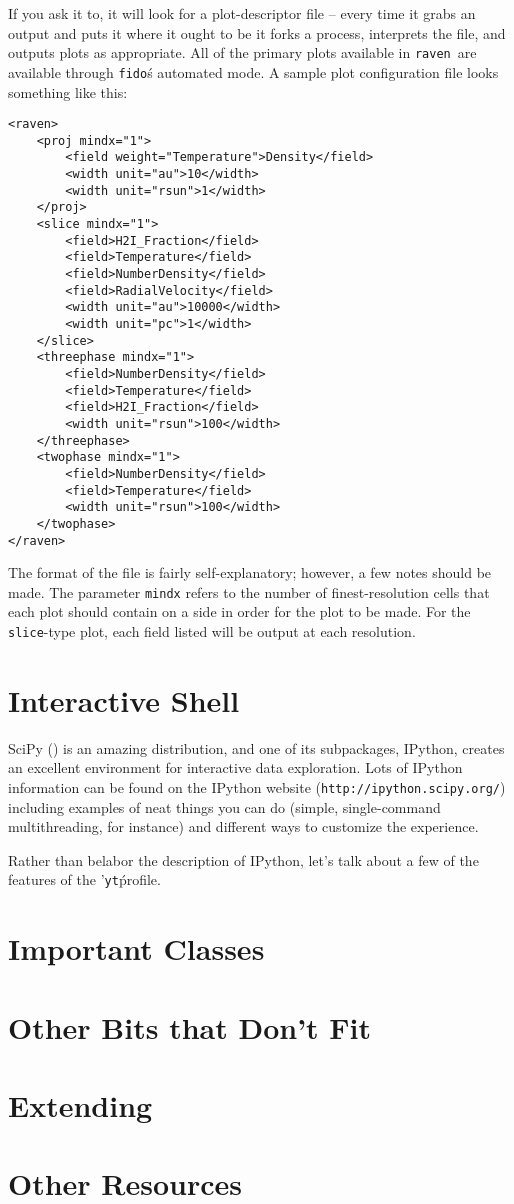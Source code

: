 \documentclass{article}
\newcommand{\fido}{\texttt{fido}}
\newcommand{\raven}{\texttt{raven}}
\newcommand{\yt}{\texttt{yt}}
\begin{document}
If you ask it to, it will look for a plot-descriptor file --  every time it
grabs an output and puts it where it ought to be it forks a process, interprets
the file, and outputs plots as appropriate.  All of the primary plots available
in \raven\ are available through \fido\'s automated mode.  A sample plot
configuration file looks something like this:

\begin{verbatim}
<raven>
    <proj mindx="1">
        <field weight="Temperature">Density</field>
        <width unit="au">10</width>
        <width unit="rsun">1</width>
    </proj>
    <slice mindx="1">
        <field>H2I_Fraction</field>
        <field>Temperature</field>
        <field>NumberDensity</field>
        <field>RadialVelocity</field>
        <width unit="au">10000</width>
        <width unit="pc">1</width>
    </slice>
    <threephase mindx="1">
        <field>NumberDensity</field>
        <field>Temperature</field>
        <field>H2I_Fraction</field>
        <width unit="rsun">100</width>
    </threephase>
    <twophase mindx="1">
        <field>NumberDensity</field>
        <field>Temperature</field>
        <width unit="rsun">100</width>
    </twophase>
</raven>
\end{verbatim}

The format of the file is fairly self-explanatory; however, a few notes should
be made.  The parameter \texttt{mindx} refers to the number of
finest-resolution cells that each plot should contain on a side in order for
the plot to be made.  For the \texttt{slice}-type plot, each field listed will
be output at each resolution.

\clearpage
\section{Interactive Shell}

SciPy () is an amazing distribution, and one of its
subpackages, IPython, creates an excellent environment for interactive data
exploration.  Lots of IPython information can be found on the IPython website
(\texttt{http://ipython.scipy.org/}) including examples of neat things you can
do (simple, single-command multithreading, for instance) and different ways to
customize the experience.

Rather than belabor the description of IPython, let's talk about a few of the
features of the '\yt\' profile.

\clearpage
\section{Important Classes}

\clearpage
\section{Other Bits that Don't Fit}

\clearpage
\section{Extending}

\clearpage
\section{Other Resources}
\end{document}
